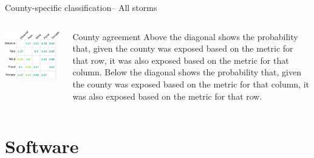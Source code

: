 \documentclass[ignorenonframetext,]{beamer}
\begin{document}
\begin{frame}{County-specific classification-- All storms}

\begin{columns}
\begin{column}{0.6\textwidth}

\includegraphics[width=\textwidth]{anderson_jan18_files/figure-beamer/unnamed-chunk-20-1} 
\end{column}
\begin{column}{0.4\textwidth}
\small
\begin{block}{County agreement}
Above the diagonal shows the probability that, given the county was exposed based on the metric for that row, it was also exposed based on the metric for that column. Below the diagonal shows the probability that, given the county was exposed based on the metric for that column, it was also exposed based on the metric for that row.
\end{block}
\end{column}
\end{columns}

\end{frame}

\section{Software}\label{software}
\end{document}

